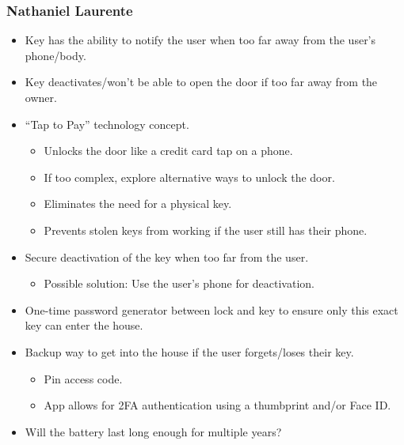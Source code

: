 \subsubsection*{Nathaniel Laurente}
\begin{itemize}
    \item Key has the ability to notify the user when too far away from the user’s phone/body.
    \item Key deactivates/won’t be able to open the door if too far away from the owner.
    \item “Tap to Pay” technology concept.
    \begin{itemize}
        \item Unlocks the door like a credit card tap on a phone.
        \item If too complex, explore alternative ways to unlock the door.
        \item Eliminates the need for a physical key.
        \item Prevents stolen keys from working if the user still has their phone.
    \end{itemize}
    \item Secure deactivation of the key when too far from the user.
    \begin{itemize}
        \item Possible solution: Use the user's phone for deactivation.
    \end{itemize}
    \item One-time password generator between lock and key to ensure only this exact key can enter the house.
    \item Backup way to get into the house if the user forgets/loses their key.
    \begin{itemize}
        \item Pin access code.
        \item App allows for 2FA authentication using a thumbprint and/or Face ID.
    \end{itemize}
    \item Will the battery last long enough for multiple years?
\end{itemize}

